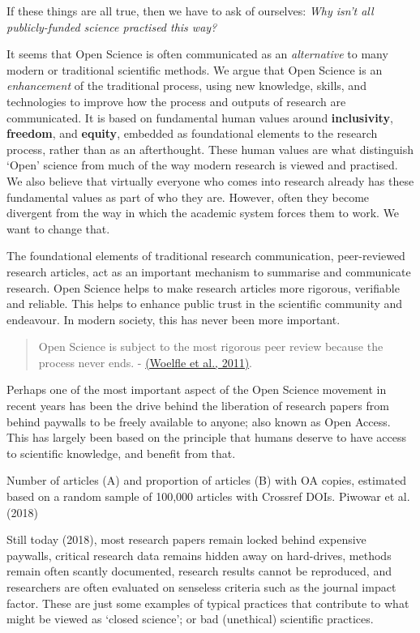 \documentclass[]{book}
\begin{document}
If these things are all true, then we have to ask of ourselves: \emph{Why isn't all publicly-funded science practised this way?}

It seems that Open Science is often communicated as an \emph{alternative} to many modern or traditional scientific methods. We argue that Open Science is an \emph{enhancement} of the traditional process, using new knowledge, skills, and technologies to improve how the process and outputs of research are communicated. It is based on fundamental human values around \textbf{inclusivity}, \textbf{freedom}, and \textbf{equity}, embedded as foundational elements to the research process, rather than as an afterthought. These human values are what distinguish `Open' science from much of the way modern research is viewed and practised. We also believe that virtually everyone who comes into research already has these fundamental values as part of who they are. However, often they become divergent from the way in which the academic system forces them to work. We want to change that.

The foundational elements of traditional research communication, peer-reviewed research articles, act as an important mechanism to summarise and communicate research. Open Science helps to make research articles more rigorous, verifiable and reliable. This helps to enhance public trust in the scientific community and endeavour. In modern society, this has never been more important.

\begin{quote}
Open Science is subject to the most rigorous peer review because the process never ends. - \href{https://github.com/OpenScienceMOOC/Module-1-Open-Principles/blob/master/Reading\%20Material_Open\%20Principles/Woelfle\%20et\%20al.\%2C\%202011.pdf}{(Woelfle et al., 2011)}.
\end{quote}

Perhaps one of the most important aspect of the Open Science movement in recent years has been the drive behind the liberation of research papers from behind paywalls to be freely available to anyone; also known as Open Access. This has largely been based on the principle that humans deserve to have access to scientific knowledge, and benefit from that.

Number of articles (A) and proportion of articles (B) with OA copies, estimated based on a random sample of 100,000 articles with Crossref DOIs. Piwowar et al. (2018)

Still today (2018), most research papers remain locked behind expensive paywalls, critical research data remains hidden away on hard-drives, methods remain often scantly documented, research results cannot be reproduced, and researchers are often evaluated on senseless criteria such as the journal impact factor. These are just some examples of typical practices that contribute to what might be viewed as `closed science'; or bad (unethical) scientific practices.
\end{document}

